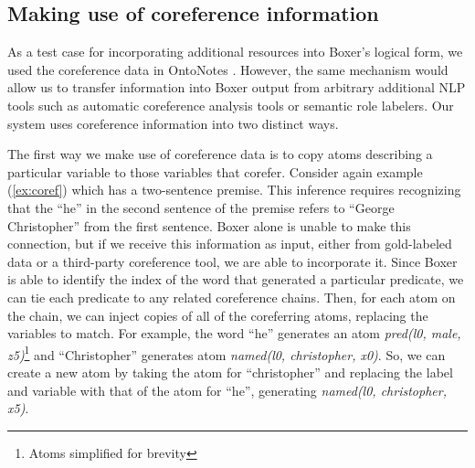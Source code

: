 \subsection*{Making use of coreference information}

As a test case for incorporating additional resources into Boxer's logical form,
we used the coreference data in OntoNotes \citep{hovy:naacl2006}.  However,
the same mechanism would allow us to transfer information into Boxer output from
arbitrary additional NLP tools such as 
automatic coreference analysis tools or semantic role labelers. 
Our system uses coreference information into two distinct ways.

The first way we make use of coreference data is to copy atoms describing a
particular variable to those variables that corefer. 
Consider again example (\ref{ex:coref}) which has a two-sentence premise. 
This inference requires recognizing that the ``he'' in the second sentence of
the premise refers to ``George Christopher'' from the first sentence.  Boxer
alone is unable to make this connection, but if we receive this information as
input, either from gold-labeled data or a third-party coreference tool, we are
able to incorporate it.  Since Boxer is able to identify the index of the word
that generated a particular predicate, we can tie each predicate to any related
coreference chains.  Then, for each atom on the chain, we can inject copies
of all of the coreferring atoms, replacing the variables to match.
For example, the word ``he'' generates an atom  
{\it pred(l0, male, z5)}\footnote{Atoms simplified for brevity} and
``Christopher'' generates atom {\it named(l0, christopher, x0)}. So, we can
create a new atom by taking the atom for ``christopher'' and replacing the 
label and variable with that of the atom for ``he'',
generating  {\it named(l0, christopher, x5)}.

